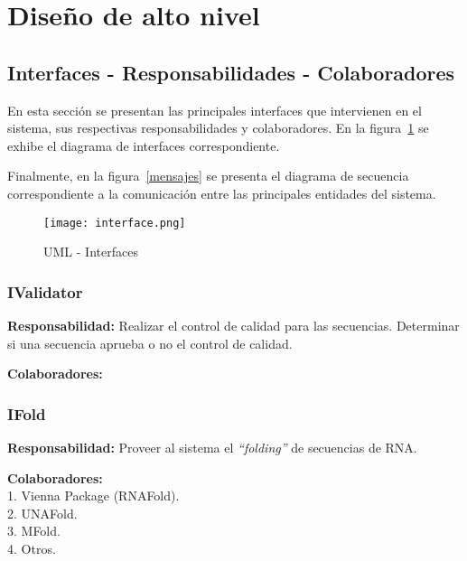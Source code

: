 \section{Diseño de alto nivel}
\label{high_level_design}

\subsection{Interfaces - Responsabilidades - Colaboradores}
En esta sección se presentan las principales interfaces que intervienen en el sistema, sus respectivas responsabilidades y colaboradores. En la figura~\ref{interface} se exhibe el diagrama de interfaces correspondiente.

Finalmente, en la figura~\ref{mensajes} se presenta el diagrama de secuencia correspondiente a la comunicación entre las principales entidades del sistema.

\begin{figure}[!hbtp]
	\begin{center}
		\texttt{[image: interface.png]}
		\caption{UML - Interfaces}
		\label{interface}
	\end{center}
\end{figure}

\subsubsection{IValidator}
\par \textbf{Responsabilidad:} Realizar el control de calidad para las secuencias. Determinar si una secuencia aprueba o no el control de calidad. 

\par \textbf{Colaboradores:}
 
\subsubsection{IFold}
\par \textbf{Responsabilidad:} Proveer al sistema el \emph{``folding''} de secuencias de RNA.

\par \textbf{Colaboradores:} \\
\hspace*{3.75cm} 1. Vienna Package (RNAFold). \\
\hspace*{3.75cm} 2. UNAFold. \\
\hspace*{3.75cm} 3. MFold. \\
\hspace*{3.75cm} 4. Otros.


